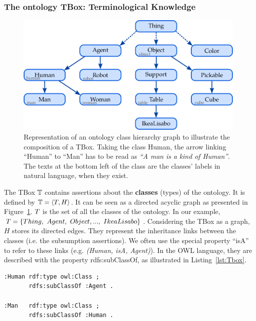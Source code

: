 \subsubsection{The ontology TBox: Terminological Knowledge}

\begin{figure}[ht!]
\centering
\includegraphics[scale=0.4]{figures/chapter2/Tbox.png}
\caption{\label{fig:Tbox} Representation of an ontology class hierarchy graph to illustrate the composition of a TBox. Taking the class Human, the arrow linking ``Human'' to ``Man'' has to be read as \textit{``A man is a kind of Human''}. The texts at the bottom left of the class are the classes' labels in natural language, when they exist.}
\end{figure}

The TBox $\mathbb{T}$ contains assertions about the \textbf{classes} (types) of the ontology. It is defined by $\mathbb{T} = \langle T, H \rangle$. It can be seen as a directed acyclic graph as presented in Figure~\ref{fig:Tbox}. $T$ is the set of all the classes of the ontology. In our example, $T = \{Thing,\ Agent,\ Object, ...,\ IkeaLisabo\}$. Considering the TBox as a graph, $H$ stores its directed edges. They represent the inheritance links between the classes (i.e. the subsumption assertions). We often use the special property ``isA'' to refer to these links (e.g. \textit{(Human, isA, Agent)}). In the OWL language, they are described with the property rdfs:subClassOf, as illustrated in Listing~\ref{lst:Tbox}.

\noindent
\begin{minipage}{\textwidth}
\begin{lstlisting}[frame=single, basicstyle=\scriptsize\ttfamily, label={lst:Tbox}, caption={Description of ontology classes in the OWL language using the Turle syntax.},captionpos=b, style=OwlTurtle]
:Human rdf:type owl:Class ;
       rdfs:subClassOf :Agent .

:Man   rdf:type owl:Class ;
       rdfs:subClassOf :Human .
\end{lstlisting}
\end{minipage}

